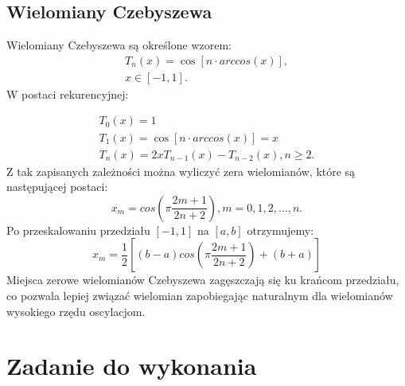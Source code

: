 \documentclass{article}
\begin{document}
\subsection{Wielomiany Czebyszewa}
Wielomiany Czebyszewa są określone wzorem:
\begin{equation}
\begin{array}{l}
T_n(x) = \cos[n \cdot arccos(x)], \\
x \in [-1, 1].
\end{array}
\end{equation}
W postaci rekurencyjnej:

\begin{equation}
\begin{array}{l}
T_0(x) = 1\\
T_1(x) = \cos[n \cdot arccos(x)] = x \\
T_n(x) = 2xT_{n-1}(x) - T_{n-2}(x), n \geq 2.
\end{array}
\end{equation}
Z tak zapisanych zależności można wyliczyć zera wielomianów, które są następującej postaci:
\begin{equation}
x_m = cos(\pi \frac{2m +1}{2n + 2}), m=0,1,2, . . . , n.
\end{equation}
Po przeskalowaniu przedziału $[-1, 1]$ na $[a, b]$ otrzymujemy:
\begin{equation}
x_m = \frac{1}{2} [(b -a) cos(\pi \frac{2m +1}{2n + 2}) + (b + a) ]
\end{equation}
Miejsca zerowe wielomianów Czebyszewa zagęszczają się ku krańcom przedziału, co pozwala lepiej związać wielomian zapobiegając naturalnym dla wielomianów wysokiego rzędu oscylacjom. \cite{2}
\section{Zadanie do wykonania}
\end{document}

